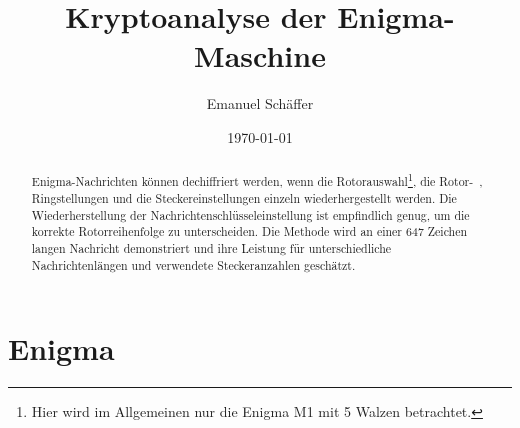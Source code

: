 \documentclass[ngerman, a4paper, footsepline, headsepline, numbers=noenddot]{scrreport}
\begin{document}
	\subject{Ein praktischer Ansatz zur Dechiffrierung von Texten der Enigma-Maschine}
	\title{Kryptoanalyse der Enigma-Maschine}
	\author{Emanuel Schäffer}
	\date{\today}
	\publishers{RWU--University of Applied Sciences}
	\maketitle
	
	\begin{abstract}
		Enigma-Nachrichten können dechiffriert werden, wenn die Rotorauswahl\footnote{Hier wird im Allgemeinen nur die Enigma M1 mit 5 Walzen betrachtet.}, die Rotor-~, Ringstellungen und die Steckereinstellungen einzeln wiederhergestellt werden. Die Wiederherstellung der Nachrichtenschlüsseleinstellung ist empfindlich genug, um die korrekte Rotorreihenfolge zu unterscheiden. Die Methode wird an einer 647 Zeichen langen Nachricht demonstriert und ihre Leistung für unterschiedliche Nachrichtenlängen und verwendete Steckeranzahlen geschätzt.
	\end{abstract}


	\chapter{Enigma}
	
\end{document}
